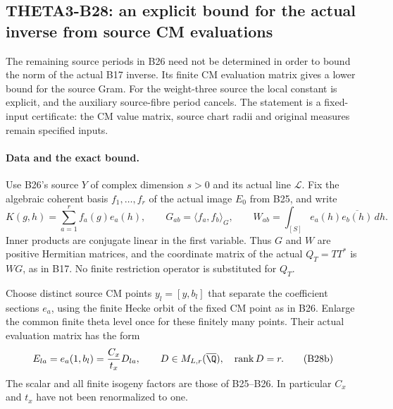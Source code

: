 \subsection{THETA3-B28: an explicit bound for the actual inverse from source CM evaluations}\label{B28}

The remaining source periods in B26 need not be determined in
order to bound the norm of the actual B17 inverse.  Its finite
CM evaluation matrix gives a lower bound for the source Gram.
For the weight-three source the local constant is explicit,
and the auxiliary source-fibre period cancels.  The statement
is a fixed-input certificate: the CM value matrix, source chart
radii and original measures remain specified inputs.

\paragraph{Data and the exact bound.}
Use B26's source $Y$ of complex dimension $s>0$ and its actual
line $\mathscr L$.  Fix the algebraic coherent basis
$f_1,\ldots,f_r$ of the actual image $E_0$ from B25, and write
\[
 K(g,h)=\sum_{a=1}^r f_a(g)e_a(h),\qquad
 G_{ab}=\langle f_a,f_b\rangle_G,\qquad
 W_{ab}=\int_{[S]}e_a(h)\overline{e_b(h)}\,dh.
 \tag{B28a}
\]
Inner products are conjugate linear in the first variable.
Thus $G$ and $W$ are positive Hermitian matrices, and the
coordinate matrix of the actual $Q_T=TT^*$ is $WG$, as in B17.
No finite restriction operator is substituted for $Q_T$.

Choose distinct source CM points $y_l=[y,b_l]$ that separate
the coefficient sections $e_a$, using the finite Hecke orbit
of the fixed CM point as in B26.  Enlarge the common finite
theta level once for these finitely many points.  Their actual
evaluation matrix has the form
\[
       E_{la}=e_a(1,b_l)={C_x\over t_x}D_{la},
       \qquad D\in M_{L,r}(\overline\Q),\quad
                     \operatorname{rank}D=r.
 \tag{B28b}
\]
The scalar and all finite isogeny factors are those of B25--B26.
In particular $C_x$ and $t_x$ have not been renormalized to one.

